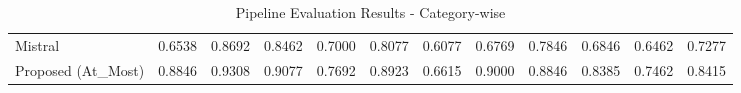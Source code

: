 \begin{table}
{\begin{tabular}{lcccccccccc||c}
            Mistral                            & 0.6538                                                  & 0.8692                                                  & 0.8462                                                  & 0.7000                                                            & 0.8077                                                  & 0.6077                                                    & 0.6769                                                            & 0.7846                                                  & 0.6846                                 & 0.6462                                   & 0.7277 \\
            Proposed (At\_Most)                & 0.8846                                                  & 0.9308                                                  & 0.9077                                                  & 0.7692                                                            & 0.8923                                                  & 0.6615                                                    & 0.9000                                                            & 0.8846                                                  & 0.8385                                 & 0.7462                                   & 0.8415 \\
            \bottomrule
        \end{tabular}}
    \caption{Pipeline Evaluation Results - Category-wise}
    \label{tab:evaluation_results-full-category}
\end{table}


